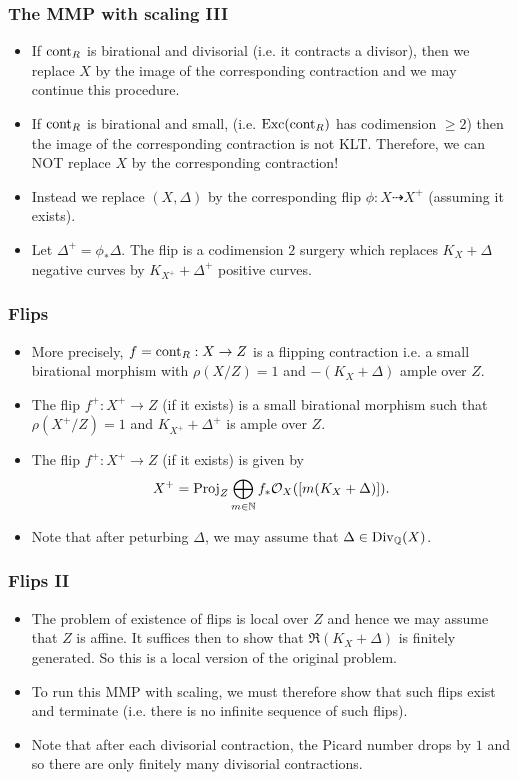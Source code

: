 \documentclass{beamer}
\theoremstyle{plain}
\theoremstyle{definition}
\theoremstyle{remark}
\def\Q{\mathbb {Q}}
\def\OO{\mathcal {O}}
\begin{document}
\begin{frame}
\frametitle{The MMP with scaling III}
\begin{itemize}
\item If ${\rm cont}_R$ is birational and divisorial (i.e. it contracts a divisor), then we replace $X$ by the image of the corresponding contraction and we may continue this procedure.
\pause
\item If ${\rm cont}_R$ is birational and small, (i.e. ${\rm Exc}({\rm cont}_R)$ has codimension $\geq 2$) then the image of the corresponding contraction
is not KLT. Therefore, we can NOT replace $X$ by the corresponding contraction!
\pause
\item Instead we replace $(X,\Delta)$ by the corresponding flip 
$\phi :X\dasharrow
X^+$ (assuming it exists).
\pause
\item Let $\Delta ^+=\phi _* \Delta$. The flip is a codimension $2$ surgery 
which replaces $K_X+\Delta$ negative curves by
 $K_{X^+}+\Delta^+$ positive curves.
\end{itemize}
\end{frame}

\begin{frame}
 \frametitle{Flips}
\begin{itemize}
\item More precisely, $f={\rm cont} _R:X\to Z$ is a flipping contraction i.e. a small birational morphism with $\rho (X/Z)=1$ and $-(K_X+\Delta)$ ample over $Z$.
\pause
\item The flip $f^+:X^+\to Z$ (if it exists) is a small birational morphism such that $\rho (X^+/Z)=1$ and $K_{X^+}+\Delta  ^+$ is  ample over $Z$.
\pause
\item The flip $f^+:X^+\to Z$ (if it exists) is given by
$$X^+={\rm Proj}_Z \bigoplus_{m\in \mathbb {N}} f_*\OO _X( [m(K_X+\Delta)]).$$
\pause
\item Note that after peturbing $\Delta$, we may assume that $\Delta \in{\rm Div }_\Q (X)$.
\end{itemize}

\end{frame}
\begin{frame}
 \frametitle{Flips II}
\begin{itemize}
\item The problem of existence of flips is local over $Z$ and hence we may
assume that $Z$ is affine. It suffices then to show that
$\mathfrak{R}(K_X+\Delta)$ is finitely generated.
So this is a local version of the original problem.
\pause
\item To run this MMP with scaling, we must therefore show that such flips
exist and terminate (i.e. there is no infinite sequence of such flips).
\pause
\item Note that after each divisorial contraction, the Picard number drops by $1$ and so there are only finitely many divisorial contractions.
\end{itemize}

\end{frame}
\end{document}
